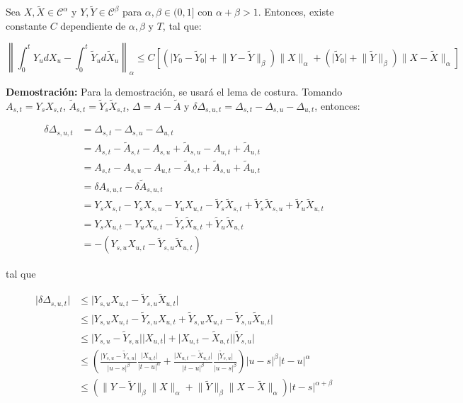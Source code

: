 \begin{prop}
	Sea $X, \tilde{X} \in \mathcal{C}^{\alpha}$ y $Y, \tilde{Y} \in \mathcal{C}^{\beta}$ para $\alpha, \beta \in (0,1]$ con $\alpha + \beta > 1$. Entonces, existe constante $C$ dependiente de $\alpha, \beta$ y $T$, tal que:

	\[
		\left \lVert \int_0^t Y_u dX_u - \int_0^t \tilde{Y}_u d\tilde{X}_u \right \rVert_{\alpha} \leq C \left[  \left( \lvert Y_0 - \tilde{Y}_0 \rvert +   \lVert Y - \tilde{Y} \rVert_{\beta} \right) \lVert X \rVert_{\alpha} + \left(  \lvert \tilde{Y}_0 \rvert + \lVert \tilde{Y} \rVert_{\beta} \right) \lVert X - \tilde{X} \rVert_{\alpha} \right]
	\] 
\end{prop}

\textbf{Demostración:} Para la demostración, se usará el lema de costura. Tomando $A_{s,t} = Y_s X_{s,t}$, $\tilde{A}_{s,t} = \tilde{Y}_s \tilde{X}_{s,t}$, $\Delta = A - \tilde{A}$ y $\delta \Delta_{s,u,t} = \Delta_{s,t} - \Delta_{s,u} - \Delta_{u,t}$, entonces:

\begin{align*}
	\delta \Delta_{s,u,t} &= \Delta_{s,t} - \Delta_{s,u} - \Delta_{u,t} \\
	&= A_{s,t} - \tilde{A}_{s,t} - A_{s,u} + \tilde{A}_{s,u} - A_{u,t} + \tilde{A}_{u,t} \\
	&= A_{s,t} - A_{s,u} - A_{u,t} - \tilde{A}_{s,t}  + \tilde{A}_{s,u}  + \tilde{A}_{u,t} \\
	&= \delta A_{s,u,t} - \delta \tilde{A}_{s,u,t} \\
	&= Y_s X_{s,t} - Y_s X_{s,u} - Y_u X_{u,t} - \tilde{Y}_s \tilde{X}_{s,t} + \tilde{Y}_s \tilde{X}_{s,u}  + \tilde{Y}_u \tilde{X}_{u,t} \\
	&= Y_s X_{u,t} - Y_u X_{u,t} - \tilde{Y}_s \tilde{X}_{u,t} + \tilde{Y}_u \tilde{X}_{u,t} \\
	&= - (Y_{s,u} X_{u,t} - \tilde{Y}_{s,u} \tilde{X}_{u,t})
\end{align*}

tal que 


\begin{align*}
	\lvert \delta \Delta_{s,u,t} \rvert &\leq \lvert Y_{s,u} X_{u,t} - \tilde{Y}_{s,u} \tilde{X}_{u,t} \rvert \\
	&\leq \lvert Y_{s,u} X_{u,t} - \tilde{Y}_{s,u} X_{u,t} + \tilde{Y}_{s,u} X_{u,t} - \tilde{Y}_{s,u} \tilde{X}_{u,t} \rvert \\
	&\leq \lvert Y_{s,u} - \tilde{Y}_{s,u}  \rvert \lvert X_{u,t} \rvert + \lvert X_{u,t} - \tilde{X}_{u,t} \rvert \lvert \tilde{Y}_{s,u}  \rvert \\
	&\leq \left(  \frac{ \lvert Y_{s,u} - \tilde{Y}_{s,u}  \rvert }{ \lvert  u - s \rvert^{\beta}  }  \frac{ \lvert X_{u,t} \rvert }{ \lvert t - u \rvert^{\alpha}   } + \frac{ \lvert X_{u,t} - \tilde{X}_{u,t} \rvert }{ \lvert t - u \rvert^{\beta} } \frac{ \lvert \tilde{Y}_{s,u}  \rvert}{\lvert u - s \rvert^{\beta}} \right) \lvert u - s \rvert^{\beta} \lvert t - u \rvert^{\alpha}  \\ 
	&\leq \left(   \lVert Y - \tilde{Y} \rVert_{\beta} \rVert X \lVert_{\alpha} + \lVert \tilde{Y} \rVert_{\beta} \lVert X - \tilde{X} \rVert_{\alpha}  \right) \lvert t - s \rvert^{\alpha + \beta}
\end{align*}


